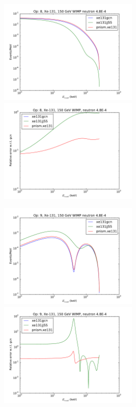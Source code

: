 \documentclass{article}
\begin{document}
\includegraphics[width=0.5\textwidth]{xe131-o8}
\includegraphics[width=0.5\textwidth]{xe131-o8-relerr}

\includegraphics[width=0.5\textwidth]{xe131-o9}
\includegraphics[width=0.5\textwidth]{xe131-o9-relerr}
\end{document}
